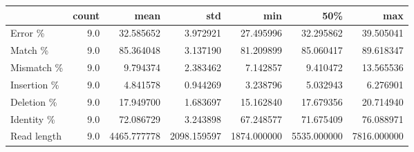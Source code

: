 \begin{tabular}{lrrrrrr}
\toprule
{} &  count &         mean &          std &          min &          50\% &          max \\
\midrule
Error \%     &    9.0 &    32.585652 &     3.972921 &    27.495996 &    32.295862 &    39.505041 \\
Match \%     &    9.0 &    85.364048 &     3.137190 &    81.209899 &    85.060417 &    89.618347 \\
Mismatch \%  &    9.0 &     9.794374 &     2.383462 &     7.142857 &     9.410472 &    13.565536 \\
Insertion \% &    9.0 &     4.841578 &     0.944269 &     3.238796 &     5.032943 &     6.276901 \\
Deletion \%  &    9.0 &    17.949700 &     1.683697 &    15.162840 &    17.679356 &    20.714940 \\
Identity \%  &    9.0 &    72.086729 &     3.243898 &    67.248577 &    71.675409 &    76.088971 \\
Read length &    9.0 &  4465.777778 &  2098.159597 &  1874.000000 &  5535.000000 &  7816.000000 \\
\bottomrule
\end{tabular}
